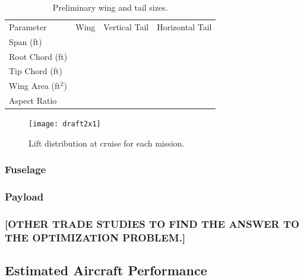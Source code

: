 \documentclass[report]{byu-aero}
\begin{document}
\begin{table}[h!]
	\centering
	\caption{Preliminary wing and tail sizes.}
	\label{tab:prelimwingsize}
	\begin{tabular}{ C{1in}  C{1in}  C{1in}  C{1in}}
		
		Parameter & Wing & Vertical Tail & Horizontal Tail \\
		
		Span (ft) & & &\\
		
		Root Chord (ft) & & &\\
		
		Tip Chord (ft) & & &\\
		
		Wing Area (ft\(^2\)) & & &\\
		
		Aspect Ratio & & &\\
		
	\end{tabular}
\end{table}


\begin{figure}[h!]
	\centering
	\texttt{[image: draft2x1]}
	\caption{Lift distribution at cruise for each mission.}
	\label{fig:prelimliftdist}
\end{figure}


\subsubsection{Fuselage}

\subsubsection{Payload}

\subsubsection{\color{\BYUred} [OTHER TRADE STUDIES TO FIND THE ANSWER TO THE OPTIMIZATION PROBLEM.]}


\subsection{Estimated Aircraft Performance}
\label{ssec:estaircraftperfomance}
\end{document}
